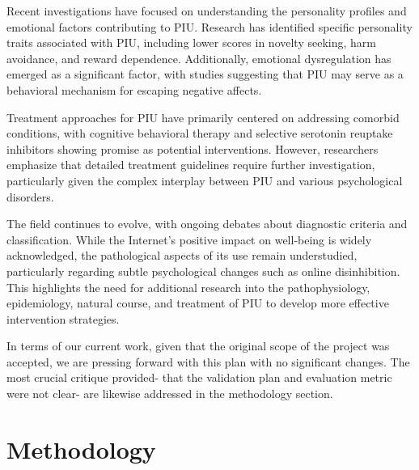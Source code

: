 \documentclass[11pt]{extarticle}
\newcommand{\todo}{\textcolor{red}{TODO:}~}
\begin{document}
    Recent investigations have focused on understanding the personality profiles and emotional factors contributing to PIU. Research has identified specific personality traits associated with PIU, including lower scores in novelty seeking, harm avoidance, and reward dependence. 
    Additionally, emotional dysregulation has emerged as a significant factor, with studies suggesting that PIU may serve as a behavioral mechanism for escaping negative affects.
    
    Treatment approaches for PIU have primarily centered on addressing comorbid conditions, with cognitive behavioral therapy and selective serotonin reuptake inhibitors showing promise as potential interventions.
    However, researchers emphasize that detailed treatment guidelines require further investigation, particularly given the complex interplay between PIU and various psychological disorders.
    
    The field continues to evolve, with ongoing debates about diagnostic criteria and classification. While the Internet's positive impact on well-being is widely acknowledged, the pathological aspects of its use remain understudied, particularly regarding subtle psychological changes such as online disinhibition. 
    This highlights the need for additional research into the pathophysiology, epidemiology, natural course, and treatment of PIU to develop more effective intervention strategies.

    In terms of our current work, given that the original scope of the project was accepted, we are pressing forward with this plan with no significant changes.
    The most crucial critique provided- that the validation plan and evaluation metric were not clear- are likewise addressed in the methodology section.


\section{Methodology} 
\end{document}
